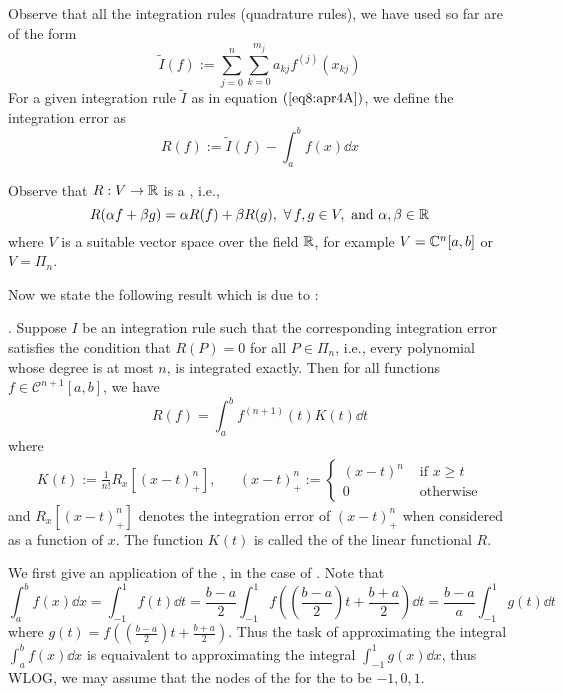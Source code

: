 Observe that all the integration rules (quadrature rules), we have used so far are of the form
\begin{equation}\label{eq8:apr4A}
    \tilde{I}(f) := \sum_{j=0}^n \sum_{k=0}^{m_j} a_{kj} f^{(j)}(x_{kj})  
\end{equation} 
For a given integration rule $\tilde{I}$ as in equation $(\ref{eq8:apr4A})$, we define the integration error as 
\begin{equation}\label{eq9:apr4}
    R(f) := \tilde{I}(f) - \int_a^b f(x) \dd{x} 
\end{equation}  
\begin{rmk}
    Observe that $R : V \to \mathbb{R}$ is a , i.e., 
    \[
        R(\alpha f + \beta g) = \alpha R(f) + \beta R(g), \ \forall \, f,g \in V, \mbox{ and } \alpha, \beta \in \mathbb{R}    
    \]
    where $V$ is a suitable vector space over the field $\mathbb{R}$, for example $V = \mathbb{C}^n[a,b]$ or $V = \Pi_n$.
\end{rmk}

Now we state the following result which is due to :

\begin{thm}\label{peano}.
    Suppose $I$ be an integration rule such that the corresponding integration error satisfies the condition that $R(P) = 0$ for all $ P \in \Pi_n$, i.e., every polynomial whose degree is at most $n$, is integrated exactly. Then for all functions $ f \in \mathcal{C}^{n+1}[a,b]$, we have 
    \[
        R(f) = \int_a^b f^{(n+1)}(t) K(t) \dd{t}  
    \] 
    where 
    \begin{align*}
        K(t) := \frac{1}{n!} R_x[(x-t)^n_+], &&(x-t)^n_+ := \begin{cases}
            (x-t)^n &\mbox{ if } x \geq t \\ 
            0 & \mbox{ otherwise}
        \end{cases}
    \end{align*}
    and $R_x[(x-t)^n_+]$ denotes the integration error of $(x-t)^n_+$ when considered as a function of $x$. The function $K(t)$ is called the  of the linear functional $R$.
\end{thm}

We first give an application of the , in the case of . Note that 
\[
    \int_a^b f(x) \dd{x} = \int_{-1}^1 f(t) \dd{t} = \frac{b-a}{2} \int_{-1}^1 f \left( \left(\frac{b-a}{2}\right)t + \frac{b+a}{2} \right) \dd{t} = \frac{b-a}{a} \int_{-1}^1 g(t) \dd{t}
\]
where $g(t) = f \left( \left(\frac{b-a}{2}\right)t + \frac{b+a}{2} \right)$. Thus the task of approximating the integral $\int_a^b f(x) \dd{x}$ is equaivalent to approximating the integral $\int_{-1}^1 g(x) \dd{x}$, thus WLOG, we may assume that the nodes of the  for the  to be $-1,0,1$.

